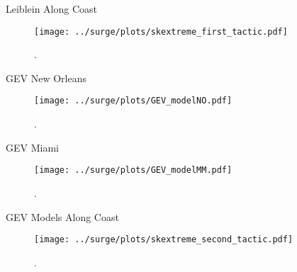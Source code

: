 \begin{frame}{Leiblein Along Coast}
\vspace{-20pt}
 \begin{minipage}{1.0\textwidth}
\begin{figure}[htb!]
    \centering
    \texttt{[image: ../surge/plots/skextreme\_first\_tactic.pdf]}
    \vspace{-15pt}
   \caption{. }
    \label{fig:}
\end{figure}
\end{minipage}
\end{frame}


\begin{frame}{GEV New Orleans}
\vspace{-20pt}
 \begin{minipage}{1.0\textwidth}
\begin{figure}[htb!]
    \centering
    \texttt{[image: ../surge/plots/GEV\_modelNO.pdf]}
    \vspace{-15pt}
   \caption{. }
    \label{fig:}
\end{figure}
\end{minipage}
\end{frame}

\begin{frame}{GEV Miami}
\vspace{-20pt}
 \begin{minipage}{1.0\textwidth}
\begin{figure}[htb!]
    \centering
    \texttt{[image: ../surge/plots/GEV\_modelMM.pdf]}
    \vspace{-15pt}
   \caption{. }
    \label{fig:}
\end{figure}
\end{minipage}
\end{frame}

\begin{frame}{GEV Models Along Coast}
\vspace{-20pt}
 \begin{minipage}{1.0\textwidth}
\begin{figure}[htb!]
    \centering
    \texttt{[image: ../surge/plots/skextreme\_second\_tactic.pdf]}
    \vspace{-15pt}
   \caption{. }
    \label{fig:}
\end{figure}
\end{minipage}
\end{frame}
